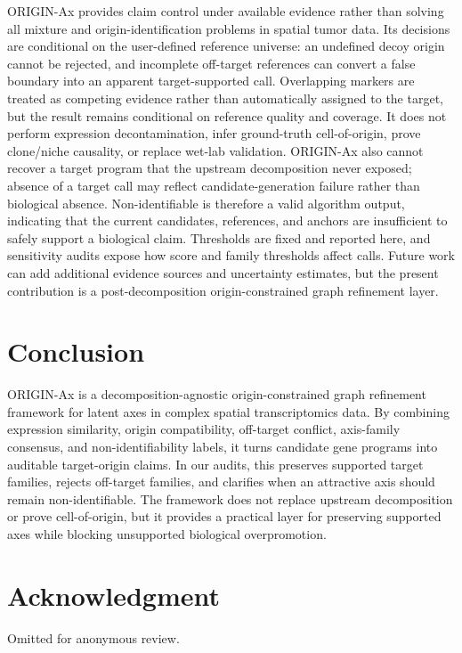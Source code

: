 \documentclass[conference]{IEEEtran}
\begin{document}
ORIGIN-Ax provides claim control under available evidence rather than solving
all mixture and origin-identification problems in spatial tumor data. Its
decisions are conditional on the user-defined reference universe: an undefined
decoy origin cannot be rejected, and incomplete off-target references can
convert a false boundary into an apparent target-supported call. Overlapping
markers are treated as competing evidence rather than automatically assigned to
the target, but the result remains conditional on reference quality and
coverage. It does not
perform expression decontamination, infer ground-truth cell-of-origin, prove
clone/niche causality, or replace wet-lab validation. ORIGIN-Ax also cannot
recover a target program that the upstream decomposition never exposed; absence
of a target call may reflect candidate-generation failure rather than biological
absence. Non-identifiable is therefore a valid algorithm output, indicating that
the current candidates, references, and anchors are insufficient to safely
support a biological claim. Thresholds are fixed and reported here, and
sensitivity audits expose how score and family thresholds affect calls. Future
work can add additional evidence sources and uncertainty estimates, but the
present contribution is a post-decomposition origin-constrained graph refinement
layer.

\section{Conclusion}

ORIGIN-Ax is a decomposition-agnostic origin-constrained graph refinement
framework for latent axes in complex spatial transcriptomics data. By combining
expression similarity, origin compatibility, off-target conflict, axis-family
consensus, and non-identifiability labels, it turns candidate gene programs into
auditable target-origin claims. In our audits, this preserves supported target
families, rejects off-target families, and clarifies when an attractive axis
should remain non-identifiable. The framework does not replace upstream
decomposition or prove cell-of-origin, but it provides a practical layer for
preserving supported axes while blocking unsupported biological overpromotion.

\FloatBarrier
\section*{Acknowledgment}

Omitted for anonymous review.



\end{document}
